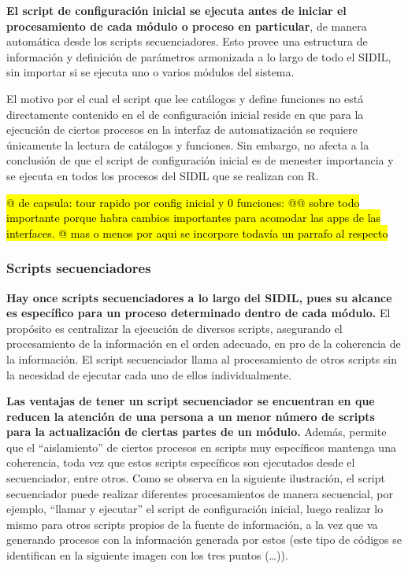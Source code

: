 \documentclass[
]{article}
\begin{document}
\textbf{El script de configuración inicial se ejecuta antes de iniciar el procesamiento de cada módulo o proceso en particular}, de manera automática desde los scripts secuenciadores. Esto provee una estructura de información y definición de parámetros armonizada a lo largo de todo el SIDIL, sin importar si se ejecuta uno o varios módulos del sistema.

El motivo por el cual el script que lee catálogos y define funciones no está directamente contenido en el de configuración inicial reside en que para la ejecución de ciertos procesos en la interfaz de automatización se requiere únicamente la lectura de catálogos y funciones. Sin embargo, no afecta a la conclusión de que el script de configuración inicial es de menester importancia y se ejecuta en todos los procesos del SIDIL que se realizan con R.

\hl{@\citet{Propuesta} de capsula: tour rapido por config inicial y 0 funciones:
@@ sobre todo importante porque habra cambios importantes para acomodar las apps de las interfaces.
@\citet{posiblemente} mas o menos por aqui se incorpore todavía un parrafo al respecto}

\hypertarget{secuenciadores}{%
\subsubsection{Scripts secuenciadores}\label{secuenciadores}}

\textbf{Hay once scripts secuenciadores a lo largo del SIDIL, pues su alcance es específico para un proceso determinado dentro de cada módulo.} El propósito es centralizar la ejecución de diversos scripts, asegurando el procesamiento de la información en el orden adecuado, en pro de la coherencia de la información. El script secuenciador llama al procesamiento de otros scripts sin la necesidad de ejecutar cada uno de ellos individualmente.

\textbf{Las ventajas de tener un script secuenciador se encuentran en que reducen la atención de una persona a un menor número de scripts para la actualización de ciertas partes de un módulo.} Además, permite que el ``aislamiento'' de ciertos procesos en scripts muy específicos mantenga una coherencia, toda vez que estos scripts específicos son ejecutados desde el secuenciador, entre otros. Como se observa en la siguiente ilustración, el script secuenciador puede realizar diferentes procesamientos de manera secuencial, por ejemplo, ``llamar y ejecutar'' el script de configuración inicial, luego realizar lo mismo para otros scripts propios de la fuente de información, a la vez que va generando procesos con la información generada por estos (este tipo de códigos se identifican en la siguiente imagen con los tres puntos (\ldots)).
\end{document}
